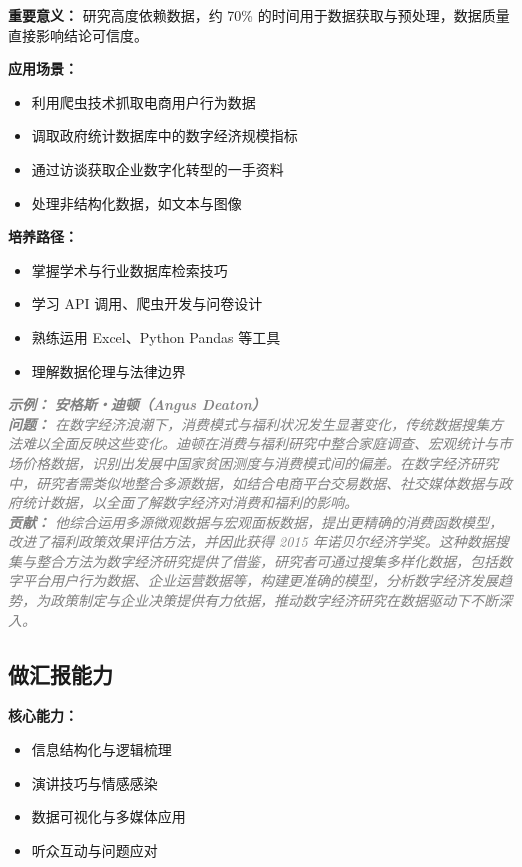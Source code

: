 \documentclass[lang=cn,12pt,a4paper]{elegantpaper}
\newcommand{\skillexample}[1]{\smallskip\noindent\textcolor{gray}{\textit{\footnotesize\textbf{示例：}} \textit{\footnotesize #1}}}
\begin{document}
\textbf {重要意义：} 研究高度依赖数据，约 70\% 的时间用于数据获取与预处理，数据质量直接影响结论可信度。

\textbf {应用场景：}
\begin {itemize}
\item 利用爬虫技术抓取电商用户行为数据
\item 调取政府统计数据库中的数字经济规模指标
\item 通过访谈获取企业数字化转型的一手资料
\item 处理非结构化数据，如文本与图像
\end {itemize}

\textbf {培养路径：}
\begin {itemize}
\item 掌握学术与行业数据库检索技巧
\item 学习 API 调用、爬虫开发与问卷设计
\item 熟练运用 Excel、Python Pandas 等工具
\item 理解数据伦理与法律边界
\end {itemize}

\skillexample {
\textbf {安格斯・迪顿（Angus Deaton）}\\
\textbf {问题：} 在数字经济浪潮下，消费模式与福利状况发生显著变化，传统数据搜集方法难以全面反映这些变化。迪顿在消费与福利研究中整合家庭调查、宏观统计与市场价格数据，识别出发展中国家贫困测度与消费模式间的偏差。在数字经济研究中，研究者需类似地整合多源数据，如结合电商平台交易数据、社交媒体数据与政府统计数据，以全面了解数字经济对消费和福利的影响。\\
\textbf {贡献：} 他综合运用多源微观数据与宏观面板数据，提出更精确的消费函数模型，改进了福利政策效果评估方法，并因此获得 2015 年诺贝尔经济学奖。这种数据搜集与整合方法为数字经济研究提供了借鉴，研究者可通过搜集多样化数据，包括数字平台用户行为数据、企业运营数据等，构建更准确的模型，分析数字经济发展趋势，为政策制定与企业决策提供有力依据，推动数字经济研究在数据驱动下不断深入。
}

\subsection {做汇报能力}\label {sec:reporting}
\textbf {核心能力：}
\begin {itemize}
\item 信息结构化与逻辑梳理
\item 演讲技巧与情感感染
\item 数据可视化与多媒体应用
\item 听众互动与问题应对
\end {itemize}
\end{document}
